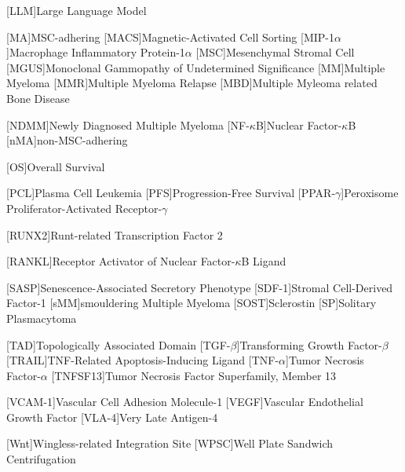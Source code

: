 {\begin{spacing}{-.0}
\begin{acronym}
            [LLM]{Large Language Model}

            [MA]{MSC-adhering}
            [MACS]{Magnetic-Activated Cell Sorting}
            [MIP-1$\alpha$]{Macrophage Inflammatory Protein-1$\alpha$}
            [MSC]{Mesenchymal Stromal Cell}
            [MGUS]{Monoclonal Gammopathy of Undetermined Significance}
            [MM]{Multiple Myeloma}
            [MMR]{Multiple Myeloma Relapse}
            [MBD]{Multiple Myleoma related Bone Disease}

            [NDMM]{Newly Diagnosed Multiple Myeloma}
            [NF-$\kappa$B]{Nuclear Factor-$\kappa$B}
            [nMA]{non-MSC-adhering}

            [OS]{Overall Survival}

            [PCL]{Plasma Cell Leukemia}
            [PFS]{Progression-Free Survival}
            [PPAR-$\gamma$]{Peroxisome Proliferator-Activated Receptor\nolinebreak-$\gamma$}

            [RUNX2]{Runt-related Transcription Factor 2}

            [RANKL]{Receptor Activator of Nuclear Factor-$\kappa$B Ligand}

            [SASP]{Senescence-Associated Secretory Phenotype} %
            [SDF-1]{Stromal Cell-Derived Factor-1}
            [sMM]{smouldering Multiple Myeloma}
            [SOST]{Sclerostin}
            [SP]{Solitary Plasmacytoma}

            [TAD]{Topologically Associated Domain}
            [TGF-$\beta$]{Transforming Growth Factor-$\beta$}
            [TRAIL]{TNF-Related Apoptosis-Inducing Ligand}
            [TNF-$\alpha$]{Tumor Necrosis Factor-$\alpha$}
            [TNFSF13]{Tumor Necrosis Factor Superfamily, Member 13}

            [VCAM-1]{Vascular Cell Adhesion Molecule-1}
            [VEGF]{Vascular Endothelial Growth Factor}
            [VLA-4]{Very Late Antigen-4}

            [Wnt]{Wingless-related Integration Site}
            [WPSC]{Well Plate Sandwich Centrifugation}


        \end{acronym}
    \end{spacing}
}
